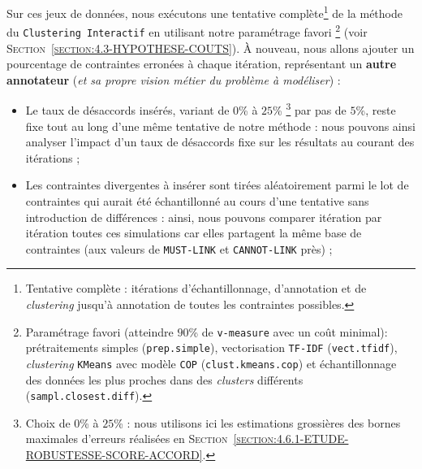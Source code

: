 			Sur ces jeux de données, nous exécutons une tentative complète\footnote{
				Tentative complète : itérations d'échantillonnage, d'annotation et de \textit{clustering} jusqu'à annotation de toutes les contraintes possibles.
			}
			de la méthode du \texttt{Clustering Interactif} en utilisant notre paramétrage favori \footnote{
				Paramétrage favori (atteindre $90$\% de \texttt{v-measure} avec un coût minimal): prétraitements simples (\texttt{prep.simple}), vectorisation \texttt{TF-IDF} (\texttt{vect.tfidf}), \textit{clustering} \texttt{KMeans} avec modèle \texttt{COP} (\texttt{clust.kmeans.cop}) et échantillonnage des données les plus proches dans des \textit{clusters} différents (\texttt{sampl.closest.diff}).
			} (voir \textsc{Section~\ref{section:4.3-HYPOTHESE-COUTS}}).
			À nouveau, nous allons ajouter un pourcentage de contraintes erronées à chaque itération, représentant un \textbf{autre annotateur} (\textit{et sa propre vision métier du problème à modéliser}) :
			\begin{itemize}
				\item Le taux de désaccords insérés, variant de $0$\% à $25$\% \footnote{
					Choix de $0$\% à $25$\% : nous utilisons ici les estimations grossières des bornes maximales d'erreurs réalisées en \textsc{Section~\ref{section:4.6.1-ETUDE-ROBUSTESSE-SCORE-ACCORD}}.
				} par pas de $5$\%, reste fixe tout au long d'une même tentative de notre méthode : nous pouvons ainsi analyser l'impact d'un taux de désaccords fixe sur les résultats au courant des itérations ;
				\item Les contraintes divergentes à insérer sont tirées aléatoirement parmi le lot de contraintes qui aurait été échantillonné au cours d'une tentative sans introduction de différences : ainsi, nous pouvons comparer itération par itération toutes ces simulations car elles partagent la même base de contraintes (aux valeurs de \texttt{MUST-LINK} et \texttt{CANNOT-LINK} près) ;
			\end{itemize}
			

